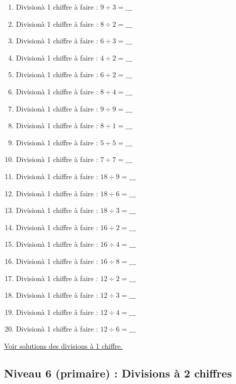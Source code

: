\documentclass[11pt]{article}
\begin{document}
\begin{enumerate}
\item Divisionà 1 chiffre à faire :  \(9 \div 3 =  \_\_\_\)
\item Divisionà 1 chiffre à faire :  \(8 \div 2 = \_\_\_\)
\item Divisionà 1 chiffre à faire :  \(6 \div 3 = \_\_\_\)
\item Divisionà 1 chiffre à faire :  \(4 \div 2 = \_\_\_\)
\item Divisionà 1 chiffre à faire :  \(6 \div 2 = \_\_\_\)
\item Divisionà 1 chiffre à faire :  \(8 \div 4 = \_\_\_\)
\item Divisionà 1 chiffre à faire :  \(9 \div 9 = \_\_\_\)
\item Divisionà 1 chiffre à faire :  \(8 \div 1 = \_\_\_\)
\item Divisionà 1 chiffre à faire :  \(5 \div 5 = \_\_\_\)
\item Divisionà 1 chiffre à faire :  \(7 \div 7 = \_\_\_\)
\item Divisionà 1 chiffre à faire :  \(18 \div 9 =  \_\_\_\)
\item Divisionà 1 chiffre à faire :  \(18 \div 6 = \_\_\_\)
\item Divisionà 1 chiffre à faire :  \(18 \div 3 = \_\_\_\)
\item Divisionà 1 chiffre à faire :  \(16 \div 2 = \_\_\_\)
\item Divisionà 1 chiffre à faire :  \(16 \div 4 = \_\_\_\)
\item Divisionà 1 chiffre à faire :  \(16 \div 8 = \_\_\_\)
\item Divisionà 1 chiffre à faire :  \(12 \div 2 = \_\_\_\)
\item Divisionà 1 chiffre à faire :  \(12 \div 3 = \_\_\_\)
\item Divisionà 1 chiffre à faire :  \(12 \div 4 = \_\_\_\)
\item Divisionà 1 chiffre à faire :  \(12 \div 6 = \_\_\_\)
\end{enumerate}




\hyperref[orge6753fe]{Voir solutions des divisions à 1 chiffre.}




\newpage

\subsection{Niveau 6 (primaire) : Divisions à 2 chiffres}
\label{sec:org6ea88db}
\label{orgdda3b20}
\end{document}
